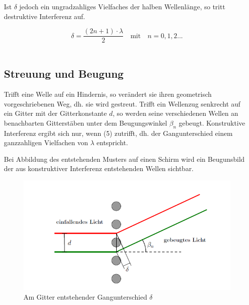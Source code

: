 \documentclass[12pt,a4paper,titlepage,headinclude,bibtotoc]{scrartcl}
\begin{document}
Ist $\delta$ jedoch ein ungradzahliges Vielfaches der halben Wellenlänge, so tritt destruktive Interferenz auf. \\
\par
\begin{equation}\delta = \frac{{(2n+1)}\cdot{\lambda}}{2}\quad \mathrm{mit} \quad n=0,1,2...\end{equation}
\\
\par


\subsection{Streuung und Beugung}
Trifft eine Welle auf ein Hindernis, so verändert sie ihren geometrisch vorgeschriebenen Weg, dh. sie wird gestreut. %
Trifft ein Wellenzug senkrecht auf ein Gitter mit der Gitterkonstante $d$, so werden seine verschiedenen Wellen an benachbarten Gitterstäben unter dem Beugungswinkel $\beta_n$ gebeugt. Konstruktive Interferenz ergibt sich nur, wenn (5) zutrifft, dh. der Gangunterschied einem ganzzahligen Vielfachen von $\lambda$ entspricht.\\
\par
Bei Abbildung des entstehenden Musters auf einen Schirm wird ein Beugunsbild der aus konstruktiver Interferenz entstehenden Wellen sichtbar.

\begin{figure} [h]
\begin{center}
\includegraphics[scale=0.75]{Gangunterschied.png} \end{center}
\caption{Am Gitter entstehender Gangunterschied $\delta$}
\end{figure}
\end{document}
